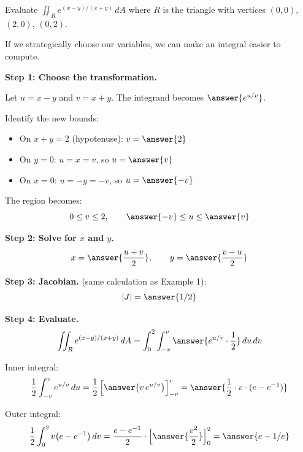 \documentclass{ximera}
\begin{document}
\begin{problem}
Evaluate $\displaystyle\iint_R e^{(x-y)/(x+y)}\,dA$ where $R$ is the triangle with vertices $(0,0)$, $(2,0)$, $(0,2)$.

If we strategically choose our variables, we can make an integral easier to compute.

\textbf{Step 1: Choose the transformation.}

Let $u = x - y$ and $v = x + y$.  The integrand becomes $\answer{e^{u/v}}$.

Identify the new bounds:
\begin{itemize}
  \item On $x+y = 2$ (hypotenuse): $v = \answer{2}$
  \item On $y = 0$: $u = x = v$, so $u = \answer{v}$
  \item On $x = 0$: $u = -y = -v$, so $u = \answer{-v}$
\end{itemize}

The region becomes:
$$0 \leq v \leq 2, \qquad \answer{-v} \leq u \leq \answer{v}$$

\textbf{Step 2: Solve for $x$ and $y$.}
$$x = \answer{\frac{u+v}{2}}, \qquad y = \answer{\frac{v-u}{2}}$$

\textbf{Step 3: Jacobian.}  (same calculation as Example 1):
$$|J| = \answer{1/2}$$

\textbf{Step 4: Evaluate.}
$$\iint_R e^{(x-y)/(x+y)}\,dA = \int_0^2\int_{-v}^{v} \answer{e^{u/v} \cdot \frac{1}{2}}\,du\,dv$$

Inner integral:
$$\frac{1}{2}\int_{-v}^{v} e^{u/v}\,du = \frac{1}{2}\left[\answer{v\,e^{u/v}}\right]_{-v}^{v} = \answer{\frac{1}{2}\cdot v\cdot (e - e^{-1})}$$

Outer integral:
$$\frac{1}{2}\int_0^2 v\bigl(e - e^{-1}\bigr)\,dv = \frac{e-e^{-1}}{2}\cdot\Bigl[\answer{\frac{v^2}{2}}\Bigr]_0^2 = \answer{e - 1/e}$$

\end{problem}
\end{document}
